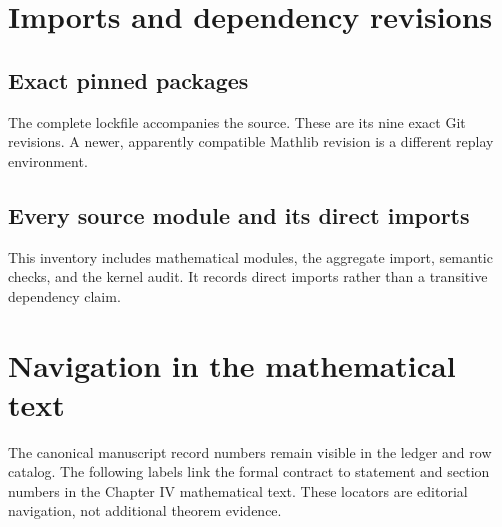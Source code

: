 \section{Imports and dependency revisions}
\subsection{Exact pinned packages}
The complete lockfile accompanies the source. These are its nine exact Git revisions. A newer, apparently compatible Mathlib revision is a different replay environment.

\subsection{Every source module and its direct imports}
This inventory includes mathematical modules, the aggregate import, semantic checks, and the kernel audit. It records direct imports rather than a transitive dependency claim.

\clearpage
\section{Navigation in the mathematical text}
The canonical manuscript record numbers remain visible in the ledger and row catalog. The following labels link the formal contract to statement and section numbers in the Chapter IV mathematical text. These locators are editorial navigation, not additional theorem evidence.


